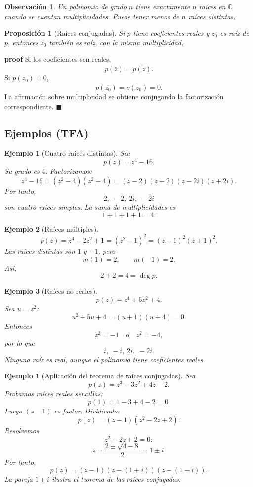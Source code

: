 \documentclass[12pt]{article}
\newtheorem{Ejem}{Ejemplo}
\newtheorem{Prop}{Proposici\'on}
\newtheorem{ejemplo}{Ejemplo}[section]
\newtheorem{Obs}{Observaci\'on}[section]
\newcommand{\C}{\mathbb{C}}
\begin{document}
\begin{Obs}
Un polinomio de grado $n$ tiene exactamente $n$ raíces en $\C$ cuando se
cuentan multiplicidades. Puede tener menos de $n$ raíces \emph{distintas}.
\end{Obs}

\begin{Prop}[Raíces conjugadas]
Si $p$ tiene coeficientes reales y $z_0$ es raíz de $p$, entonces
$\overline{z_0}$ también es raíz, con la misma multiplicidad.
\end{Prop}

\textbf{proof}
Si los coeficientes son reales,
\[
p(\overline z)=\overline{p(z)}.
\]
Si $p(z_0)=0$,
\[
p(\overline{z_0})
=\overline{p(z_0)}
=0.
\]
La afirmación sobre multiplicidad se obtiene conjugando la factorización
correspondiente.
\hfill $\blacksquare$
\subsection*{Ejemplos (TFA)}
\begin{Ejem}[Cuatro raíces distintas]
Sea
\[
p(z)=z^4-16.
\]
Su grado es $4$. Factorizamos:
\[
z^4-16=(z^2-4)(z^2+4)
=(z-2)(z+2)(z-2i)(z+2i).
\]
Por tanto,
\[
\boxed{2,\;-2,\;2i,\;-2i}
\]
son cuatro raíces simples. La suma de multiplicidades es
\[
1+1+1+1=4.
\]
\end{Ejem}

\begin{Ejem}[Raíces múltiples]
\[
p(z)=z^4-2z^2+1=(z^2-1)^2=(z-1)^2(z+1)^2.
\]
Las raíces distintas son $1$ y $-1$, pero
\[
m(1)=2,\qquad m(-1)=2.
\]
Así,
\[
2+2=4=\deg p.
\]
\end{Ejem}

\begin{Ejem}[Raíces no reales]
\[
p(z)=z^4+5z^2+4.
\]
Sea $u=z^2$:
\[
u^2+5u+4=(u+1)(u+4)=0.
\]
Entonces
\[
z^2=-1\quad\text{o}\quad z^2=-4,
\]
por lo que
\[
\boxed{i,\;-i,\;2i,\;-2i.}
\]
Ninguna raíz es real, aunque el polinomio tiene coeficientes reales.
\end{Ejem}

\begin{ejemplo}[Aplicación del teorema de raíces conjugadas]
Sea
\[
p(z)=z^3-3z^2+4z-2.
\]
Probamos raíces reales sencillas:
\[
p(1)=1-3+4-2=0.
\]
Luego $(z-1)$ es factor. Dividiendo:
\[
p(z)=(z-1)(z^2-2z+2).
\]
Resolvemos
\[
z^2-2z+2=0:
\]
\[
z=\frac{2\pm\sqrt{4-8}}2
=1\pm i.
\]
Por tanto,
\[
\boxed{
p(z)=(z-1)(z-(1+i))(z-(1-i)).
}
\]
La pareja $1\pm i$ ilustra el teorema de las raíces conjugadas.
\end{ejemplo}
\end{document}
